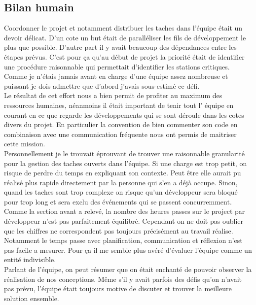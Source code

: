 \documentclass[10pt,a4paper]{book}
\begin{document}
\subsection{Bilan humain}
Coordonner le projet et notamment distribuer les taches dans l'équipe était un devoir délicat. D'un cote un but était de paralléliser les fils de développement le plus que possible. D'autre part il y avait beaucoup des dépendances entre les étapes prévus. C'est pour ça qu'au début de projet la priorité était de identifier une procédure raisonnable qui permettait d'identifier les stations critiques. Comme je n'étais jamais avant en charge d'une équipe assez nombreuse et puissant je dois admettre que d'abord j'avais sous-estimé ce défi.\\ Le résultat de cet effort nous a bien permit de profiter au maximum des ressources humaines, néanmoins il était important de tenir tout l' équipe en courant en ce que regarde les développements qui se sont déroule dans les cotes divers du projet. En particulier la convention de bien commenter son code en combinaison avec une communication fréquente nous ont permis de maitriser cette mission.\\Personnellement je le trouvait éprouvant de trouver une raisonnable granularité pour la gestion des taches ouverts dans l'équipe. Si une charge est trop petit, on risque de perdre du temps en expliquant son contexte. Peut être elle aurait pu réalisé plus rapide directement par la personne qui s'en a déjà occupe. Sinon, quand les taches sont trop complexe on risque qu'un développeur sera bloqué pour trop long et sera exclu des événements qui se passent concurremment. Comme la section avant a relevé, la nombre des heures passes sur le project par développeur n'est pas parfaitement équilibré. Cependant on ne doit pas oublier que les chiffres ne correspondent pas toujours précisément au travail réalise. Notamment le temps passe avec planification, communication et réflexion n'est pas facile a mesurer. Pour ça il me semble plus avéré d'évaluer l'équipe comme un entité indivisible.\\
Parlant de l'équipe, on peut résumer que on était enchanté de pouvoir observer la réalisation de nos conceptions. Même s'il y avait parfois des défis qu'on n'avait pas prévu, l'équipe était toujours motive de discuter et trouver la meilleure solution ensemble.
\end{document}
